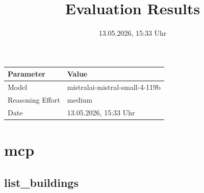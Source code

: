 \documentclass[a4paper,11pt]{article}
\title{Evaluation Results}
\date{13.05.2026, 15:33 Uhr}
\begin{document}
\maketitle

\begin{table}[H]
\centering
\begin{tabular}{l l}
\toprule
\textbf{Parameter} & \textbf{Value} \\
\midrule
Model & mistralai-mistral-small-4-119b \\
Reasoning Effort & medium \\
Date & 13.05.2026, 15:33 Uhr \\
\bottomrule
\end{tabular}
\end{table}

\tableofcontents
\clearpage

\section{mcp}

\subsection{list\_buildings}
\end{document}
